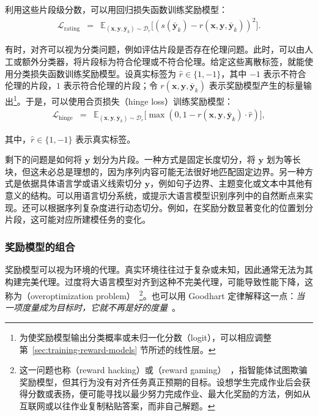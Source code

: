 利用这些片段级分数，可以用回归损失函数训练奖励模型：
\begin{eqnarray}
\mathcal{L}_{\mathrm{rating}} & = & \mathbb{E}_{(\mathbf{x},\mathbf{y},\bar{\mathbf{y}}_k) \sim \mathcal{D}_r} \big[ (s(\bar{\mathbf{y}}_k) - r(\mathbf{x}, \mathbf{y}, \bar{\mathbf{y}}_k))^2 \big].
\end{eqnarray}

有时，对齐可以视为分类问题，例如评估片段是否存在伦理问题。此时，可以由人工或额外分类器，将片段标为符合伦理或不符合伦理。给定这些离散标签，就能使用分类损失函数训练奖励模型。设真实标签为 $\hat{r} \in \{1,-1\}$，其中 $-1$ 表示不符合伦理的片段，$1$ 表示符合伦理的片段；令 $r(\mathbf{x}, \mathbf{y}, \bar{\mathbf{y}}_k)$ 表示奖励模型产生的标量输出\footnote{为使奖励模型输出分类概率或未归一化分数（logit），可以相应调整第~\ref{sec:training-reward-models} 节所述的线性层。}。于是，可以使用合页损失（hinge loss）训练奖励模型：
\begin{eqnarray}
\mathcal{L}_{\mathrm{hinge}} & = & \mathbb{E}_{(\mathbf{x},\mathbf{y},\bar{\mathbf{y}}_k) \sim \mathcal{D}_r} \big[  \max(0, 1 - r(\mathbf{x}, \mathbf{y}, \bar{\mathbf{y}}_k) \cdot \hat{r}) \big],
\end{eqnarray}

\noindent 其中，$\hat{r} \in \{1,-1\}$ 表示真实标签。

剩下的问题是如何将 $\mathbf{y}$ 划分为片段。一种方式是固定长度切分，将 $\mathbf{y}$ 划为等长块，但这未必总是理想的，因为序列内容可能无法很好地匹配固定边界。另一种方式是依据具体语言学或语义线索切分 $\mathbf{y}$，例如句子边界、主题变化或文本中其他有意义的结构。可以用语言切分系统，或提示大语言模型识别序列中的自然断点来实现。还可以根据序列复杂度进行动态切分。例如，在奖励分数显著变化的位置划分片段，这可能对应所建模任务的变化。

\subsubsection{奖励模型的组合}

\noindent 奖励模型可以视为环境的代理。真实环境往往过于复杂或未知，因此通常无法为其构建完美代理。过度将大语言模型对齐到这种不完美代理，可能导致性能下降，这称为（overoptimization problem）~\cite{stiennon-etal:2020learning,gao-etal:2023scaling}\footnote{这一问题也称（reward hacking）或（reward gaming）~\cite{krakovna-etal:2020specification,skalse-etal:2022defining,pan-etal:2022theeffects}，指智能体试图欺骗奖励模型，但其行为没有对齐任务真正预期的目标。设想学生完成作业后会获得分数或表扬，便可能寻找以最少努力完成作业、最大化奖励的方法，例如从互联网或以往作业复制粘贴答案，而非自己解题。}。也可以用 Goodhart 定律解释这一点：\textit{当一项度量成为目标时，它就不再是好的度量}~\cite{goodhart:1984problems}。

